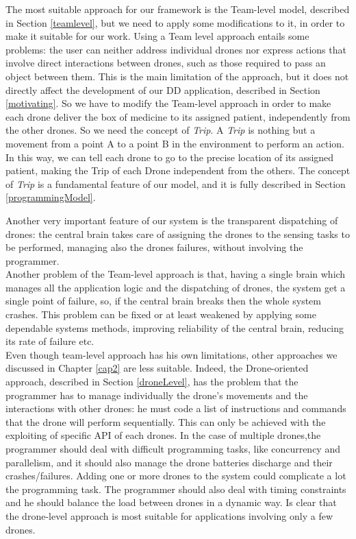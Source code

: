 The most suitable approach for our framework is the Team-level model, described in Section \ref{teamlevel}, but we need to apply some modifications to it, in order to make it suitable for our work.
Using a Team level approach entails some problems:
the user can neither address individual drones nor express actions that involve direct interactions between drones, such as those required to pass an object between them.
This is the main limitation of the approach, but it does not directly affect the development of our DD application, described in Section \ref{motivating}.
So we have to modify the Team-level approach in order to make each drone deliver the box of medicine to its assigned patient, independently from the other drones. 
So we need the concept of \textit{Trip}.
A \textit{Trip} is nothing but a movement from a point A to a point B in the environment to perform an action.
In this way, we can tell each drone to go to the precise location of its assigned patient, making the Trip of each Drone independent from the others.
The concept of \textit{Trip} is a fundamental feature of our model, and it is fully described in Section \ref{programmingModel}.

Another very important feature of our system is the transparent dispatching of drones:
the central brain takes care of assigning the drones to the sensing tasks to be performed, managing also the drones failures, without involving the programmer.
\\

Another problem of the Team-level approach is that, having a single brain which manages all the application logic and the dispatching of drones, the system get a single point of failure, so, if the central brain breaks then the whole system crashes.
This problem can be fixed or at least weakened by applying some dependable systems methods, improving reliability of the central brain, reducing its rate of failure etc.
\\

Even though team-level approach has his own limitations, other approaches we discussed in Chapter \ref{cap2} are less suitable.
Indeed, the Drone-oriented approach, described in Section \ref{droneLevel}, has the problem that the programmer has to manage individually the drone's movements and the interactions with other drones: he must code a list of instructions and commands that the drone will perform sequentially. This can only be achieved with the exploiting of specific API of each drones.
In the case of multiple drones,the programmer should deal with difficult programming tasks, like concurrency and parallelism, and it should also manage the drone batteries discharge and their crashes/failures.
Adding one or more drones to the system could complicate a lot the programming task. The programmer should also deal with timing constraints and he should balance the load between drones in a dynamic way.
Is clear that the drone-level approach is most suitable for applications involving only a few drones.
\\

